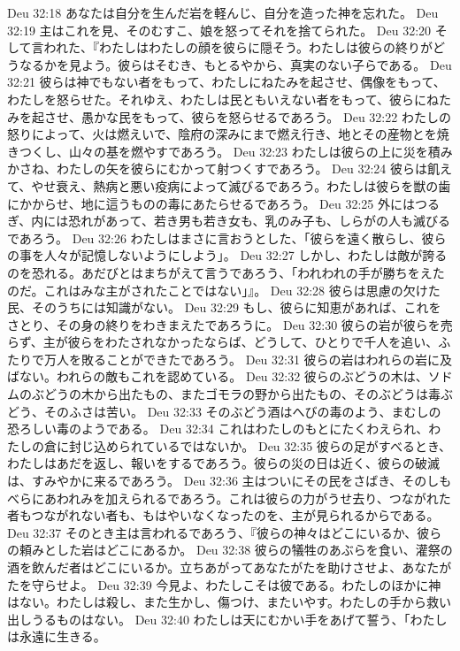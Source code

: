 Deu 32:18  あなたは自分を生んだ岩を軽んじ、自分を造った神を忘れた。
Deu 32:19  主はこれを見、そのむすこ、娘を怒ってそれを捨てられた。
Deu 32:20  そして言われた、『わたしはわたしの顔を彼らに隠そう。わたしは彼らの終りがどうなるかを見よう。彼らはそむき、もとるやから、真実のない子らである。
Deu 32:21  彼らは神でもない者をもって、わたしにねたみを起させ、偶像をもって、わたしを怒らせた。それゆえ、わたしは民ともいえない者をもって、彼らにねたみを起させ、愚かな民をもって、彼らを怒らせるであろう。
Deu 32:22  わたしの怒りによって、火は燃えいで、陰府の深みにまで燃え行き、地とその産物とを焼きつくし、山々の基を燃やすであろう。
Deu 32:23  わたしは彼らの上に災を積みかさね、わたしの矢を彼らにむかって射つくすであろう。
Deu 32:24  彼らは飢えて、やせ衰え、熱病と悪い疫病によって滅びるであろう。わたしは彼らを獣の歯にかからせ、地に這うものの毒にあたらせるであろう。
Deu 32:25  外にはつるぎ、内には恐れがあって、若き男も若き女も、乳のみ子も、しらがの人も滅びるであろう。
Deu 32:26  わたしはまさに言おうとした、「彼らを遠く散らし、彼らの事を人々が記憶しないようにしよう」。
Deu 32:27  しかし、わたしは敵が誇るのを恐れる。あだびとはまちがえて言うであろう、「われわれの手が勝ちをえたのだ。これはみな主がされたことではない」』。
Deu 32:28  彼らは思慮の欠けた民、そのうちには知識がない。
Deu 32:29  もし、彼らに知恵があれば、これをさとり、その身の終りをわきまえたであろうに。
Deu 32:30  彼らの岩が彼らを売らず、主が彼らをわたされなかったならば、どうして、ひとりで千人を追い、ふたりで万人を敗ることができたであろう。
Deu 32:31  彼らの岩はわれらの岩に及ばない。われらの敵もこれを認めている。
Deu 32:32  彼らのぶどうの木は、ソドムのぶどうの木から出たもの、またゴモラの野から出たもの、そのぶどうは毒ぶどう、そのふさは苦い。
Deu 32:33  そのぶどう酒はへびの毒のよう、まむしの恐ろしい毒のようである。
Deu 32:34  これはわたしのもとにたくわえられ、わたしの倉に封じ込められているではないか。
Deu 32:35  彼らの足がすべるとき、わたしはあだを返し、報いをするであろう。彼らの災の日は近く、彼らの破滅は、すみやかに来るであろう。
Deu 32:36  主はついにその民をさばき、そのしもべらにあわれみを加えられるであろう。これは彼らの力がうせ去り、つながれた者もつながれない者も、もはやいなくなったのを、主が見られるからである。
Deu 32:37  そのとき主は言われるであろう、『彼らの神々はどこにいるか、彼らの頼みとした岩はどこにあるか。
Deu 32:38  彼らの犠牲のあぶらを食い、灌祭の酒を飲んだ者はどこにいるか。立ちあがってあなたがたを助けさせよ、あなたがたを守らせよ。
Deu 32:39  今見よ、わたしこそは彼である。わたしのほかに神はない。わたしは殺し、また生かし、傷つけ、またいやす。わたしの手から救い出しうるものはない。
Deu 32:40  わたしは天にむかい手をあげて誓う、「わたしは永遠に生きる。
